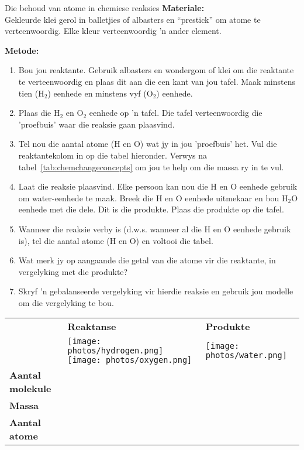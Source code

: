             \begin{activity}{Die behoud van atome in chemiese reaksies}
            \nopagebreak
            \label{m38711*id64844}\noindent
\textbf{Materiale:} \\ Gekleurde klei gerol in balletjies of albasters en “prestick” om atome te verteenwoordig. Elke kleur verteenwoordig 'n ander element.
        \par 
      \label{m38711*id64882}\noindent
\textbf{Metode:}\\
      \label{m38711*id64889}\begin{enumerate}[noitemsep, label=\textbf{\arabic*}. ] 
\label{m38711*uid36}\item Bou jou reaktante. Gebruik albasters en wondergom of klei om die reaktante te verteenwoordig en plaas dit aan die een kant van jou tafel. Maak minstens tien ($\text{H}_{2}$) eenhede en minstens vyf ($\text{O}_{2}$) eenhede.
\label{m38711*uid37}\item Plaas die $\text{H}_{2}$ en $\text{O}_{2}$ eenhede op 'n tafel. Die tafel verteenwoordig die 'proefbuis' waar die reaksie gaan plaasvind.
\label{m38711*uid38}\item Tel nou die aantal atome ($\text{H}$ en $\text{O}$) wat jy in jou 'proefbuis' het. Vul die reaktantekolom in op die tabel hieronder. Verwys na tabel~\ref{tab:chemchangeconcepts} om jou te help om die massa ry in te vul.
\label{m38711*uid39}\item Laat die reaksie plaasvind. Elke persoon kan nou die $\text{H}$ en $\text{O}$ eenhede gebruik om water-eenhede te maak. Breek die $\text{H}$ en $\text{O}$ eenhede uitmekaar en bou $\text{H}_{2}\text{O}$ eenhede met die dele. Dit is die produkte. Plaas die produkte op die tafel. 
\item Wanneer die reaksie verby is (d.w.s. wanneer al die $\text{H}$ en $\text{O}$ eenhede gebruik is), tel die aantal atome ($\text{H}$ en $\text{O}$) en voltooi die tabel.
\item Wat merk jy op aangaande die getal van die atome vir die reaktante, in vergelyking met die produkte?
\item Skryf 'n gebalanseerde vergelyking vir hierdie reaksie en gebruik jou modelle om die vergelyking te bou.
\end{enumerate}
        \par 
\begin{table}[H]
 \begin{center}
  \begin{tabular}{|l|l||l|} \hline
& \textbf{Reaktanse} & \textbf{Produkte} \\ 
& \texttt{[image: photos/hydrogen.png]} \texttt{[image: photos/oxygen.png]} & \texttt{[image: photos/water.png]} \\ \hline
   \textbf{Aantal molekule} &  &  \\ \hline
\textbf{Massa} &  &  \\ \hline
\textbf{Aantal atome} &  &  \\ \hline
  \end{tabular}


\end{center}
\end{table}
\end{activity}
